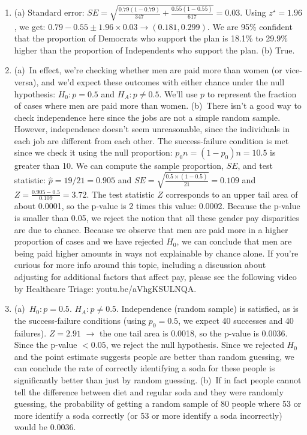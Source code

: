 \documentclass[
  10pt,
  openany]{book}
\begin{document}
\begin{enumerate}
  \addtocounter{enumi}{1}
\item
  (a) Standard error: \(SE = \sqrt{\frac{0.79(1 - 0.79)}{347} + \frac{0.55(1 - 0.55)}{617}} = 0.03.\) Using \(z^{\star} = 1.96\), we get: \(0.79 - 0.55 \pm 1.96 \times 0.03 \to (0.181, 0.299).\) We are 95\% confident that the proportion of Democrats who support the plan is 18.1\% to 29.9\% higher than the proportion of Independents who support the plan. (b) True.

  \addtocounter{enumi}{1}
\item
  (a)~In effect, we're checking whether men are paid more than women (or vice-versa), and we'd expect these outcomes with either chance under the null hypothesis: \(H_0: p = 0.5\) and \(H_A: p \neq 0.5.\) We'll use \(p\) to represent the fraction of cases where men are paid more than women. (b)~There isn't a good way to check independence here since the jobs are not a simple random sample. However, independence doesn't seem unreasonable, since the individuals in each job are different from each other. The success-failure condition is met since we check it using the null proportion: \(p_0 n = (1 - p_0) n = 10.5\) is greater than 10. We can compute the sample proportion, \(SE\), and test statistic: \(\hat{p} = 19 / 21 = 0.905\) and \(SE = \sqrt{\frac{0.5 \times (1 - 0.5)}{21}} = 0.109\) and \(Z = \frac{0.905 - 0.5}{0.109} = 3.72.\) The test statistic \(Z\) corresponds to an upper tail area of about 0.0001, so the p-value is 2 times this value: 0.0002. Because the p-value is smaller than 0.05, we reject the notion that all these gender pay disparities are due to chance. Because we observe that men are paid more in a higher proportion of cases and we have rejected \(H_0\), we can conclude that men are being paid higher amounts in ways not explainable by chance alone. If you're curious for more info around this topic, including a discussion about adjusting for additional factors that affect pay, please see the following video by Healthcare Triage: youtu.be/aVhgKSULNQA.

  \addtocounter{enumi}{1}
\item
  (a)~\(H_0: p = 0.5\). \(H_A: p \neq 0.5\). Independence (random sample) is satisfied, as is the success-failure conditions (using \(p_0 = 0.5\), we expect 40 successes and 40 failures). \(Z = 2.91\) \(\to\) the one tail area is 0.0018, so the p-value is 0.0036. Since the p-value \(< 0.05\), we reject the null hypothesis. Since we rejected \(H_0\) and the point estimate suggests people are better than random guessing, we can conclude the rate of correctly identifying a soda for these people is significantly better than just by random guessing. (b)~If in fact people cannot tell the difference between diet and regular soda and they were randomly guessing, the probability of getting a random sample of 80 people where 53 or more identify a soda correctly (or 53 or more identify a soda incorrectly) would be 0.0036.


\end{enumerate}
\end{document}
